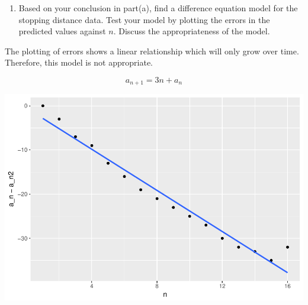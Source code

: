 \documentclass[]{article}
\newenvironment{Shaded}{\begin{snugshade}}{\end{snugshade}}
\newcommand{\KeywordTok}[1]{\textcolor[rgb]{0.13,0.29,0.53}{\textbf{{#1}}}}
\newcommand{\DataTypeTok}[1]{\textcolor[rgb]{0.13,0.29,0.53}{{#1}}}
\newcommand{\DecValTok}[1]{\textcolor[rgb]{0.00,0.00,0.81}{{#1}}}
\newcommand{\StringTok}[1]{\textcolor[rgb]{0.31,0.60,0.02}{{#1}}}
\newcommand{\OtherTok}[1]{\textcolor[rgb]{0.56,0.35,0.01}{{#1}}}
\newcommand{\NormalTok}[1]{{#1}}
\providecommand{\tightlist}{%
  \setlength{\itemsep}{0pt}\setlength{\parskip}{0pt}}
\begin{document}
\begin{enumerate}
\def\labelenumi{\alph{enumi}.}
\setcounter{enumi}{1}
\tightlist
\item
  Based on your conclusion in part(a), find a difference equation model
  for the stopping distance data. Test your model by plotting the errors
  in the predicted values against \(n\). Discuss the appropriateness of
  the model.
\end{enumerate}

The plotting of errors shows a linear relationship which will only grow
over time. Therefore, this model is not appropriate.

\[a_{n+1} = 3n+a_n\]

\begin{Shaded}
\end{Shaded}

\includegraphics{CHunt_homework1_files/figure-latex/unnamed-chunk-3-1.pdf}
\end{document}
